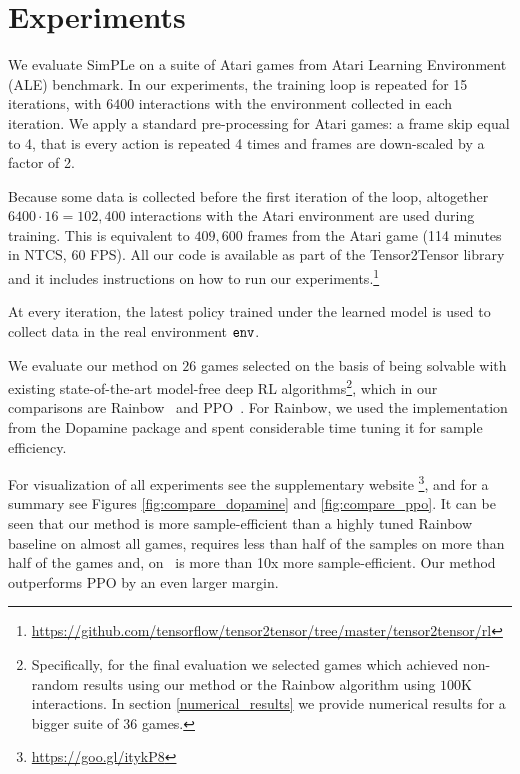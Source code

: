 \section{Experiments}
\label{sec:experiments}

We evaluate SimPLe on a suite of Atari games from Atari Learning Environment (ALE) benchmark.
In our experiments, the training loop is repeated for 15 iterations, with $6400$ interactions with the environment collected in each iteration.
We apply a standard pre-processing for Atari games: a frame skip equal to 4, that is every action
is repeated 4 times and frames are down-scaled by a factor of 2.

Because some data is collected before the first iteration of the loop,
altogether $6400 \cdot 16 = 102,400$ interactions with the Atari environment are used during training.
This is equivalent to $409,600$ frames from the Atari game (114 minutes in NTCS, 60 FPS).
All our code is available as part of the Tensor2Tensor library and it includes instructions on how
to run our experiments.\footnote{\url{https://github.com/tensorflow/tensor2tensor/tree/master/tensor2tensor/rl}} 


At every iteration, the latest policy trained under the learned model is used to collect data in the real environment ${\texttt{env}}$.

 We evaluate our method on $26$ games selected on the basis of being solvable with existing state-of-the-art model-free deep RL algorithms\footnote{Specifically, for the final evaluation we selected games which achieved non-random results using our method or the Rainbow algorithm using $100$K interactions. In section \ref{numerical_results} we provide numerical results for a bigger suite of $36$ games.}, which in our comparisons are Rainbow~\cite{rainbow} and PPO~\cite{ppo}.
 For Rainbow, we used the implementation from the Dopamine package and spent considerable
 time tuning it for sample efficiency.

For visualization of all experiments see the supplementary website \footnote{\url{https://goo.gl/itykP8}},
and for a summary see Figures \ref{fig:compare_dopamine} and  \ref{fig:compare_ppo}.
It can be seen that our method is more sample-efficient than a highly tuned Rainbow baseline on almost all games, requires less than half of the samples on more than half of the games and, on \freeway\, is more than 10x more sample-efficient. Our method outperforms PPO by an even larger margin.

